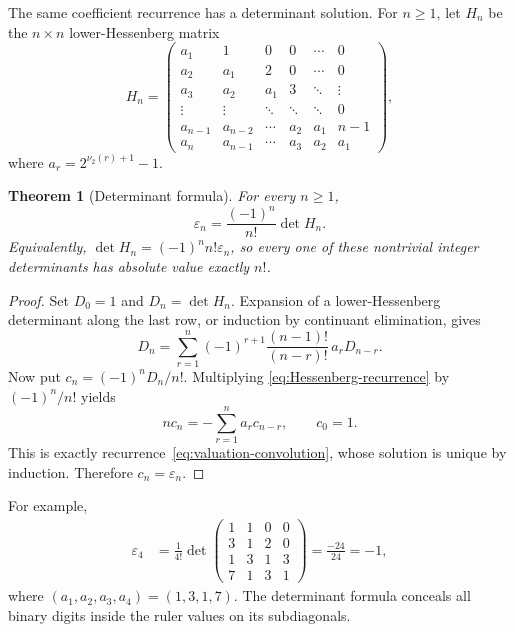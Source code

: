 \documentclass[11pt,oneside]{article}
\newtheorem{theorem}{Theorem}[section]
\theoremstyle{definition}
\theoremstyle{remark}
\newcommand{\vtwo}{\nu_2}
\begin{document}
The same coefficient recurrence has a determinant solution.  For $n\ge1$, let
$H_n$ be the $n\times n$ lower-Hessenberg matrix
\begin{equation}
 H_n=\begin{pmatrix}
 a_1&1&0&0&\cdots&0\\
 a_2&a_1&2&0&\cdots&0\\
 a_3&a_2&a_1&3&\ddots&\vdots\\
 \vdots&\vdots&\ddots&\ddots&\ddots&0\\
 a_{n-1}&a_{n-2}&\cdots&a_2&a_1&n-1\\
 a_n&a_{n-1}&\cdots&a_3&a_2&a_1
 \end{pmatrix},                                            \label{eq:Hn-matrix}
\end{equation}
where $a_r=2^{\vtwo(r)+1}-1$.

\begin{theorem}[Determinant formula]
\label{thm:determinant-formula}
For every $n\ge1$,
\begin{equation}
  \boxed{\displaystyle
  \varepsilon_n=\frac{(-1)^n}{n!}\det H_n.}                \label{eq:determinant-formula}
\end{equation}
Equivalently, $\det H_n=(-1)^nn!\varepsilon_n$, so every one of these
nontrivial integer determinants has absolute value exactly $n!$.
\end{theorem}

\begin{proof}
Set $D_0=1$ and $D_n=\det H_n$.  Expansion of a lower-Hessenberg determinant
along the last row, or induction by continuant elimination, gives
\begin{equation}
 D_n=\sum_{r=1}^{n}(-1)^{r+1}
       \frac{(n-1)!}{(n-r)!}\,a_rD_{n-r}.                  \label{eq:Hessenberg-recurrence}
\end{equation}
Now put $c_n=(-1)^nD_n/n!$.  Multiplying
\eqref{eq:Hessenberg-recurrence} by $(-1)^n/n!$ yields
\[
 nc_n=-\sum_{r=1}^{n}a_rc_{n-r},\qquad c_0=1.
\]
This is exactly recurrence~\eqref{eq:valuation-convolution}, whose solution is
unique by induction.  Therefore $c_n=\varepsilon_n$.
\end{proof}

For example,
\begin{align*}
 \varepsilon_4
 &=\frac1{4!}
 \det\begin{pmatrix}
 1&1&0&0\\
 3&1&2&0\\
 1&3&1&3\\
 7&1&3&1
 \end{pmatrix}
 =\frac{-24}{24}=-1,                                      \label{eq:det-example}
\end{align*}
where $(a_1,a_2,a_3,a_4)=(1,3,1,7)$.  The determinant formula conceals all
binary digits inside the ruler values on its subdiagonals.
\end{document}
